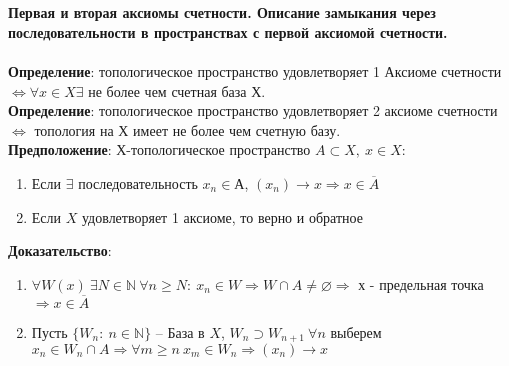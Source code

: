 \section{}
	\textbf{Первая и вторая аксиомы счетности. Описание замыкания через последовательности в пространствах с первой аксиомой счетности.}\\
	\\
	\textbf{Определение}: топологическое пространство удовлетворяет 1 Аксиоме счетности $\Leftrightarrow \forall x \in X \exists$ не более чем счетная база Х.\\
	\textbf{Определение}: топологическое пространство удовлетворяет 2 аксиоме счетности $\Leftrightarrow$ топология на Х имеет не более чем счетную базу.\\
	\textbf{Предположение}: Х-топологическое пространство $A\subset X,\ x\in X$: 
	\begin{enumerate}
		\item 
		Если $\exists$ последовательность $x_n \in А$, $(x_n)\rightarrow x \Rightarrow x \in \overline{A}$
		\item 
		Если $X$ удовлетворяет 1 аксиоме, то верно и обратное
	\end{enumerate}
	\textbf{Доказательство}: 
	\begin{enumerate}
		\item 
		$\forall W(x)\ \exists N \in \mathbb{N}\ \forall n \geqslant N:\ x_n \in W \Rightarrow W \cap A \neq \varnothing \Rightarrow$ х - предельная точка $\Rightarrow x \in \overline{A}$
		\item 
		Пусть $\{W_n:\ n \in \mathbb{N} \}$ -- База в $X$, $W_n \supset W_{n + 1}\ \forall n$ выберем $x_n \in W_n \cap A \Rightarrow \forall m \geqslant n\ x_m \in W_n \Rightarrow (x_n) \rightarrow x$
	\end{enumerate}
	

\newpage
